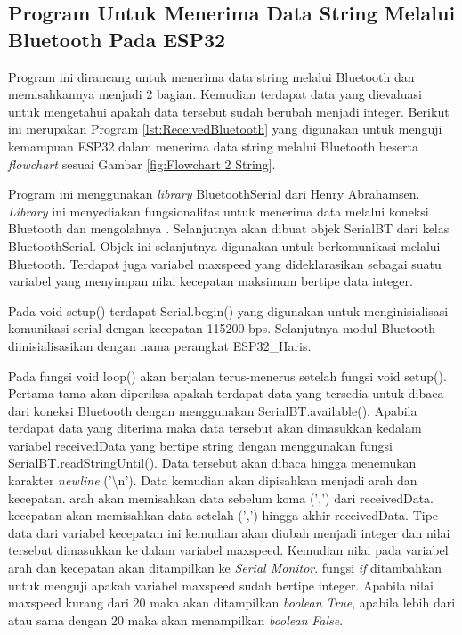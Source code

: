 \subsection{Program Untuk Menerima Data String Melalui Bluetooth Pada ESP32}

Program ini dirancang untuk menerima data string melalui Bluetooth dan memisahkannya menjadi 2 bagian. Kemudian terdapat data yang dievaluasi untuk mengetahui apakah data tersebut sudah berubah menjadi integer. Berikut ini merupakan Program \ref{lst:ReceivedBluetooth} yang digunakan untuk menguji kemampuan ESP32 dalam menerima data string melalui Bluetooth beserta \emph{flowchart} sesuai Gambar \ref{fig:Flowchart 2 String}.

Program ini menggunakan \emph{library} BluetoothSerial dari Henry Abrahamsen. \emph{Library} ini menyediakan fungsionalitas untuk menerima data melalui koneksi Bluetooth dan mengolahnya \parencite{Abrahamsen_2023}. Selanjutnya akan dibuat objek SerialBT dari kelas BluetoothSerial. Objek ini selanjutnya digunakan untuk berkomunikasi melalui Bluetooth. Terdapat juga variabel maxspeed yang dideklarasikan sebagai suatu variabel yang menyimpan nilai kecepatan maksimum bertipe data integer.

Pada void setup() terdapat Serial.begin() yang digunakan untuk menginisialisasi komunikasi serial dengan kecepatan 115200 bps. Selanjutnya modul Bluetooth diinisialisasikan dengan nama perangkat ESP32\_Haris.

Pada fungsi void loop() akan berjalan terus-menerus setelah fungsi void setup(). Pertama-tama akan diperiksa apakah terdapat data yang tersedia untuk dibaca dari koneksi Bluetooth dengan menggunakan SerialBT.available(). Apabila terdapat data yang diterima maka data tersebut akan dimasukkan kedalam variabel receivedData yang bertipe string dengan menggunakan fungsi SerialBT.readStringUntil(). Data tersebut akan dibaca hingga menemukan karakter \emph{newline} ('\textbackslash n'). Data kemudian akan dipisahkan menjadi arah dan kecepatan. arah akan memisahkan data sebelum koma (',') dari receivedData. kecepatan akan memisahkan data setelah (',') hingga akhir receivedData. Tipe data dari variabel kecepatan ini kemudian akan diubah menjadi integer dan nilai tersebut dimasukkan ke dalam variabel maxspeed. Kemudian nilai pada variabel arah dan kecepatan akan ditampilkan ke \emph{Serial Monitor}. fungsi \emph{if} ditambahkan untuk menguji apakah variabel maxspeed sudah bertipe integer. Apabila nilai maxspeed kurang dari 20 maka akan ditampilkan \emph{boolean} \emph{True}, apabila lebih dari atau sama dengan 20 maka akan menampilkan \emph{boolean} \emph{False}.

